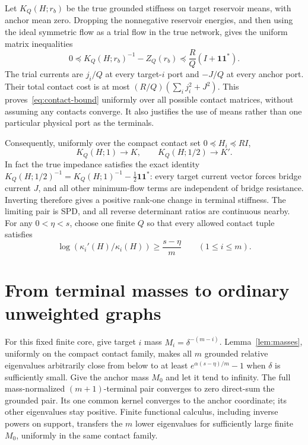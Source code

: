 \documentclass[11pt]{article}
\newcommand{\one}{\boldsymbol 1}
\begin{document}
Let $K_Q(H;r_b)$ be the true grounded stiffness on target reservoir
means, with anchor mean zero. Dropping the nonnegative reservoir
energies, and then using the ideal symmetric flow as a trial flow in
the true network, gives the uniform matrix inequalities
\begin{equation}\label{eq:contact-bound}
 0\preceq K_Q(H;r_b)^{-1}-Z_Q(r_b)
             \preceq\frac RQ(I+\one\one^*).
\end{equation}
The trial currents are $j_i/Q$ at every target-$i$ port and $-J/Q$
at every anchor port. Their total contact cost is at most
$(R/Q)(\sum_i j_i^2+J^2)$. This proves~\eqref{eq:contact-bound}
uniformly over all possible contact matrices, without assuming any
contacts converge. It also justifies the use of means rather than
one particular physical port as the terminals.

Consequently, uniformly over the compact contact set
$0\preceq H_i\preceq RI$,
\[
 K_Q(H;1)\longrightarrow K,\qquad K_Q(H;1/2)\longrightarrow K'.
\]
In fact the true impedance satisfies the exact identity
$K_Q(H;1/2)^{-1}=K_Q(H;1)^{-1}-\tfrac12\one\one^*$:
every target current vector forces bridge current $J$, and all other
minimum-flow terms are independent of bridge resistance. Inverting
therefore gives a positive rank-one change in terminal stiffness.
The limiting pair is SPD, and
all reverse determinant ratios are continuous nearby. For any
$0<\eta<s$, choose one finite $Q$ so that every allowed contact tuple
satisfies
\begin{equation}\label{eq:almost-pivots}
 \log(\kappa_i'(H)/\kappa_i(H))\ge\frac{s-\eta}{m}
                              \qquad(1\le i\le m).
\end{equation}

\section{From terminal masses to ordinary unweighted graphs}
For this fixed finite core, give target $i$ mass
$M_i=\delta^{-(m-i)}$. Lemma~\ref{lem:masses}, uniformly on the compact
contact family, makes all $m$ grounded relative eigenvalues arbitrarily
close from below to at least $e^{\alpha(s-\eta)/m}-1$ when $\delta$
is sufficiently small. Give the anchor mass $M_0$ and let it tend to
infinity. The full mass-normalized $(m+1)$-terminal pair converges to
zero direct-sum the grounded pair. Its one common kernel converges to
the anchor coordinate; its other eigenvalues stay positive. Finite
functional calculus, including inverse powers on support, transfers
the $m$ lower eigenvalues for sufficiently large finite $M_0$, uniformly
in the same contact family.
\end{document}
